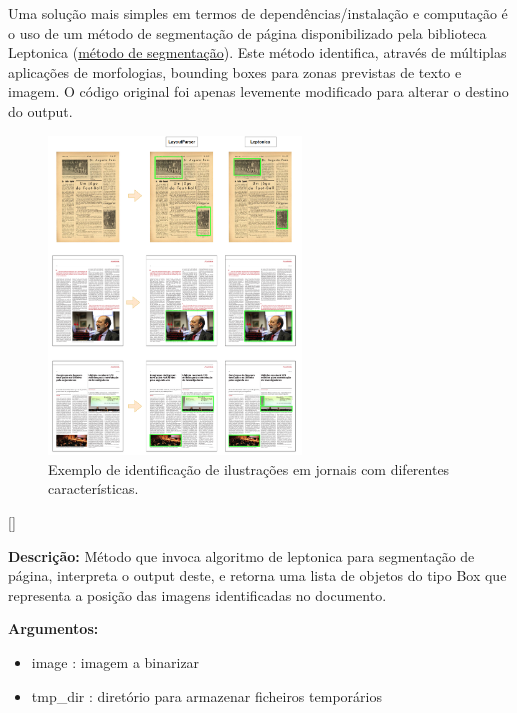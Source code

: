 Uma solução mais simples em termos de dependências/instalação e computação é o uso de um método de segmentação de página disponibilizado pela biblioteca Leptonica (\href{https://tpgit.github.io/Leptonica/livre__pageseg_8c_source.html}{método de segmentação}). 
Este método identifica, através de múltiplas aplicações de morfologias, bounding boxes para zonas previstas de texto e imagem.
O código original foi apenas levemente modificado para alterar o destino do output.


\begin{figure}[H]
	\centering
	\includegraphics[width=0.6\textwidth]{images/ilustracoes/identify_images_example.png}
	\caption{Exemplo de identificação de ilustrações em jornais com diferentes características.}
	\label{fig:identify_images_example}
\end{figure}


[\normalsize]

\textbf{Descrição:} Método que invoca algoritmo de leptonica para segmentação de página, interpreta o output deste, e retorna uma lista de objetos do tipo Box que representa a posição das imagens identificadas no documento.


\textbf{Argumentos:}
\begin{itemize}\setlength\itemsep{-0.3em}
	\item image : imagem a binarizar
	\item tmp\_dir : diretório para armazenar ficheiros temporários
\end{itemize}


\label{contribution_image_segmentation}


